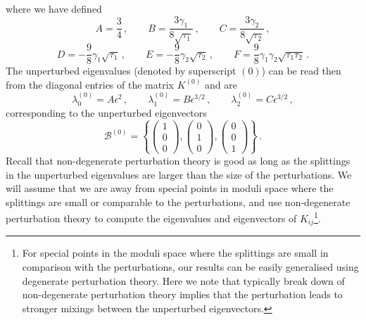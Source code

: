\documentclass[11pt,a4paper]{article}
\begin{document}
where  we have defined
\begin{equation}
A = \frac{3}{4} \,, \qquad B = \frac{3 \gamma_1}{8 \sqrt{\tau_1}} \,, \qquad C = \frac{3 \gamma_2}{8 \sqrt{\tau_2}} \,, \nonumber
\end{equation}
\begin{equation}
D = -\frac{9}{8} \gamma_1 \sqrt{\tau_1} \,, \qquad E = -\frac{9}{8} \gamma_2 \sqrt{\tau_2} \,, \qquad F = \frac{9}{8} \gamma_1 \gamma_2 \sqrt{\tau_1 \tau_2} \,.
\end{equation}
The unperturbed eigenvalues (denoted by superscript $(0)$) can be read then from the diagonal entries of the matrix $K^{(0)}$ and are
\begin{equation}
\lambda_0^{(0)} = A \epsilon^2 \,, \qquad \lambda_1^{(0)} = B \epsilon^{3/2} \,, \qquad \lambda_2^{(0)} = C \epsilon^{3/2} \,,
\end{equation}
corresponding to the unperturbed eigenvectors
\begin{equation}
\mathcal{B}^{(0)} = \left\{\begin{pmatrix} 1 \\ 0 \\ 0 \end{pmatrix}, \begin{pmatrix} 0 \\ 1 \\ 0 \end{pmatrix}, \begin{pmatrix} 0 \\ 0 \\ 1 \end{pmatrix}\right\} \,.
\end{equation}
%
Recall that non-degenerate perturbation theory is good as long as the splittings in the unperturbed eigenvalues are larger than the size of the perturbations. We will assume that we are away from special points in moduli space where the splittings are small or comparable to the perturbations, and use non-degenerate perturbation theory to compute the eigenvalues and eigenvectors of $K_{ij}$\footnote{For special points in the moduli space where the splittings are small in comparison with the perturbations, our results can be easily generalised using degenerate perturbation theory. Here we note that typically break down of non-degenerate perturbation theory implies that the perturbation leads to stronger mixings between the unperturbed eigenvectors.}. 
\end{document}

